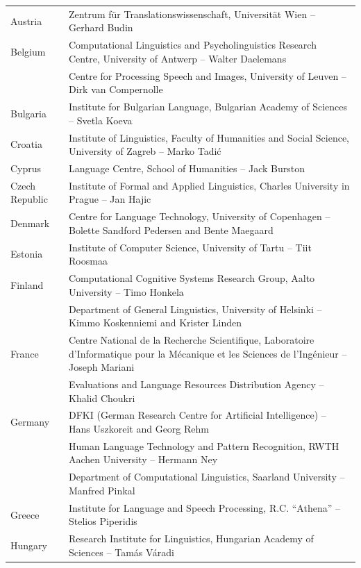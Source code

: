 \documentclass[]{../../metanetpaper}
\begin{document}
\begin{Parallel}[c]{80mm}{80mm}
  \begin{tabular*}{\textwidth}{lp{13.5cm}}
   \small
  Austria & Zentrum für Translationswissenschaft, Universität Wien -- Gerhard Budin\\
  Belgium & Computational Linguistics and Psycholinguistics Research Centre, University of Antwerp -- Walter Daelemans\\
          & Centre for Processing Speech and Images, University of Leuven -- Dirk van Compernolle \\
  Bulgaria & Institute for Bulgarian Language, Bulgarian Academy of Sciences -- Svetla Koeva \\
  Croatia & Institute of Linguistics, Faculty of Humanities and Social Science, University of Zagreb -- Marko Tadić \\
  Cyprus & Language Centre, School of Humanities -- Jack Burston \\
  Czech Republic & Institute of Formal and Applied Linguistics, Charles University in Prague -- Jan Hajic \\
  Denmark & Centre for Language Technology, University of Copenhagen -- Bolette Sandford Pedersen and Bente Maegaard\\
  Estonia & Institute of Computer Science, University of Tartu -- Tiit Roosmaa\\
  Finland & Computational Cognitive Systems Research Group, Aalto University -- Timo Honkela\\
   & Department of General Linguistics, University of Helsinki -- Kimmo Koskenniemi and Krister Linden \\
  France & Centre National de la Recherche Scientifique, Laboratoire d'Informatique pour la Mécanique et les Sciences de l'Ingénieur -- Joseph Mariani \\
  & Evaluations and Language Resources Distribution Agency -- Khalid Choukri\\
  Germany & DFKI (German Research Centre for Artificial Intelligence) -- Hans Uszkoreit and Georg Rehm\\
  & Human Language Technology and Pattern Recognition, RWTH Aachen University -- Hermann Ney \\
  & Department of Computational Linguistics, Saarland University -- Manfred Pinkal\\
  Greece & Institute for Language and Speech Processing, R.C. “Athena” -- Stelios Piperidis\\
  Hungary & Research Institute for Linguistics, Hungarian Academy of Sciences -- Tamás Váradi\\

\end{tabular*}
\end{Parallel}
\end{document}
